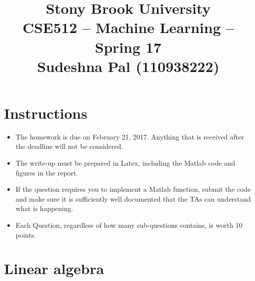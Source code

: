 \documentclass{article}
\title{\bf Stony Brook University \\ CSE512 -- Machine Learning -- Spring 17 \\  
Sudeshna Pal (110938222)}
\date{\vspace{-1cm}}
\begin{document}
\maketitle

\section*{Instructions}
\begin{itemize}
\item The homework is due on February 21, 2017. Anything that is received after the deadline will not be considered.
\item The write-up must be prepared in Latex, including the Matlab code and figures in the report.
\item If the question requires you to implement a Matlab function, submit the code and make sure it is sufficiently well documented that the TAs can understand what is happening.
\item Each Question, regardless of how many sub-questions contains, is worth 10 points.
\end{itemize}

\section{Linear algebra}
\end{document}
